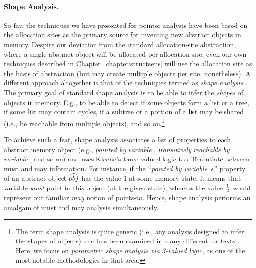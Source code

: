
\paragraph{Shape Analysis.}

So far, the techniques we have presented for pointer analysis have
been based on the allocation sites as the primary source for inventing
new abstract objects in memory. Despite our deviation from the
standard allocation-site abstraction, where a single abstract object
will be allocated per allocation site, even our own techniques
described in Chapter~\ref{chapter:structsens} will use the allocation
site as the basis of abstraction (but may create multiple objects per
site, nonetheless). A different approach altogether is that of the
techniques termed as \emph{shape analysis}
\cite{toplas/SagivRW02,popl/SagivRW99,sas/ManevichSRF04,sas/Lev-AmiS00,toplas/SagivRW98,sefm/FerraraFJ12}.
The primary goal of standard shape analysis is to be able to infer the
\emph{shapes} of objects in memory. E.g., to be able to detect if some
objects form a list or a tree, if some list may contain cycles, if a
subtree or a portion of a list may be shared (i.e., be reachable from
multiple objects), and so on.\footnote{The term shape analysis is
  quite generic (i.e., any analysis designed to infer the shapes of
  objects) and has been examined in many different contexts
  \cite{popl/GhiyaH96}. Here, we focus on \emph{parametric shape
    analysis via 3-valued logic}, as one of the most notable
  methodologies in that area.}

To achieve such a feat, shape analysis associates a list of properties
to each abstract memory object (e.g., \emph{pointed by variable
  }, \emph{transitively reachable by variable }, and so
on) and uses Kleene's three-valued logic to differentiate between must
and may information. For instance, if the ``\emph{pointed by variable}
\(\texttt{v}\)'' property of an abstract object \(\widehat{obj}\) has the
value 1 at some memory state, it means that variable 
\emph{must} point to this object (at the given state), whereas the
value \(1\over{2}\) would represent our familiar \emph{may} notion of
points-to. Hence, shape analysis performs an amalgam of must and may
analysis simultaneously.

